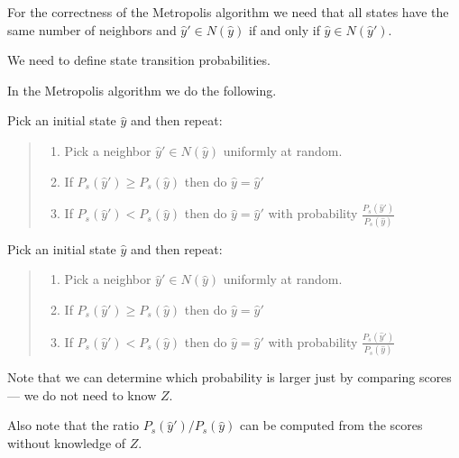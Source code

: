 {\vfill
For the correctness of the Metropolis algorithm we need that all states have the same number of neighbors
and $\hat{y}' \in N(\hat{y})$ if and only if $\hat{y} \in N(\hat{y}')$.


We need to define state transition probabilities.

\vfill
In the {\color{red} Metropolis algorithm} we do the following.

\vfill
\vfill
Pick an initial state $\hat{y}$ and then repeat:
\vspace{-2ex}
\begin{quotation}
\noindent \begin{enumerate}
        \item Pick a neighbor $\hat{y}' \in N(\hat{y})$ uniformly at random.

        \vfill
        \item If $P_s(\hat{y}') \geq P_s(\hat{y})$ then do $\hat{y} = \hat{y}'$

  \vfill
\item If $P_s(\hat{y}') < P_s(\hat{y})$ then do $\hat{y} = \hat{y}'$ with probability $\frac{P_s(\hat{y}')}{P_s(\hat{y})}$
  \end{enumerate}  
\end{quotation}

Pick an initial state $\hat{y}$ and then repeat:
\vspace{-2ex}
\begin{quotation}
\noindent \begin{enumerate}
        \item Pick a neighbor $\hat{y}' \in N(\hat{y})$ uniformly at random.

        \vfill
        \item If $P_s(\hat{y}') \geq P_s(\hat{y})$ then do $\hat{y} = \hat{y}'$

  \vfill
\item If $P_s(\hat{y}') < P_s(\hat{y})$ then do $\hat{y} = \hat{y}'$ with probability $\frac{P_s(\hat{y}')}{P_s(\hat{y})}$
  \end{enumerate}  
\end{quotation}

\vfill
Note that we can determine which probability is larger just by comparing scores --- we do not need to know $Z$.

\vfill
Also note that the ratio $P_s(\hat{y}')/P_s(\hat{y})$ can be computed from the scores without knowledge of $Z$.

}
